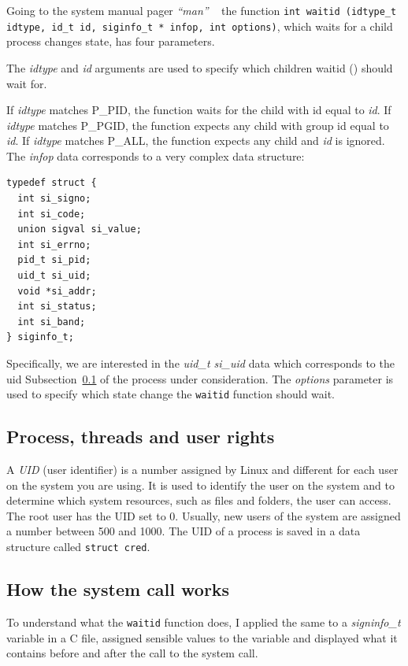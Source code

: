\documentclass{masterthesis}
\newcommand{\refToSubSection}[1]{Subsection~\ref{subsect:#1}\xspace}
\begin{document}
Going to the system manual pager \emph{``man''} ~\cite{torvalds2002linux} the function \texttt{int waitid (idtype_t idtype, id_t id, siginfo_t * infop, int options)}, which waits for a child process changes state, has four parameters.

The \textit{idtype} and \textit {id} arguments are used to specify which children waitid () should wait for.

If \textit{idtype} matches P\_PID, the function waits for the child with id equal to \textit{id}.
If \textit{idtype} matches P\_PGID, the function expects any child with group id equal to \textit{id}.
If \textit{idtype} matches P\_ALL, the function expects any child and \textit{id} is ignored.
The \textit{infop} data corresponds to a very complex data structure:

\begin{lstlisting}
typedef struct {
  int si_signo;
  int si_code;
  union sigval si_value;
  int si_errno;
  pid_t si_pid;
  uid_t si_uid;
  void *si_addr;
  int si_status;
  int si_band;
} siginfo_t;
\end{lstlisting}
Specifically, we are interested in the \textit{uid\_t si\_uid} data which corresponds to the uid \refToSubSection{proc_trhreads} of the process under consideration.  
The \textit{options} parameter is used to specify which state change the \texttt{waitid} function should wait.

\subsection{Process, threads and user rights}
\label{subsect:proc_trhreads}
A \emph{UID} (user identifier) is a number assigned by Linux and different for each user on the system you are using.
It is used to identify the user on the system and to determine which system resources, such as files and folders, the user can access.
The root user has the UID set to 0. Usually, new users of the system are assigned a number between 500 and 1000.
The UID of a process is saved in a data structure called \texttt{struct cred}.


\subsection{How the system call works}
\label{subsect:how_waitid}

To understand what the \texttt{waitid} function does, I applied the same to a \textit{signinfo\_t} variable in a C file, assigned sensible values to the variable and displayed what it contains before and after the call to the system call.
\end{document}
